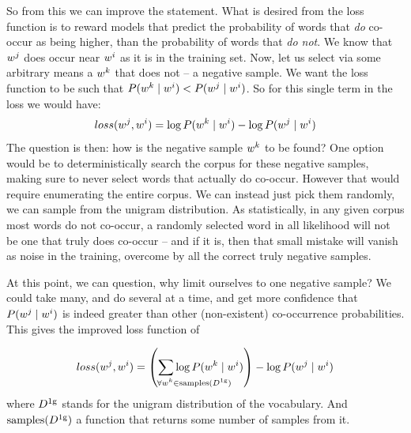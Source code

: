 \documentclass[parskip]{komatufte}
\begin{document}
So from this we can improve the statement.
What is desired from the loss function is to reward models that predict  the probability of words that \emph{do} co-occur as being higher, than the probability of words that \emph{do not}.
We know that $\n w_j$ does occur near $\n w_i$ as it is in the training set.
Now, let us select via some arbitrary means a $\n w_k$ that does not -- a negative sample.
We want the loss function to be such that $P(\n w_k\mid \n w_i) < P(\n w_j\mid \n w_i)$.
So for this single term in the loss we would have:
\begin{equation}
loss(\n w_j,\n w_i) =  \log P(\n w_k\mid \n w_i) - \log P(\n w_j\mid \n w_i)
\end{equation}
%
%
%
The question is then: how is the negative sample $\n w_k$ to be found?
One option would be to deterministically search the corpus for these negative samples, making sure to never select words that actually do co-occur.
However that would require enumerating the entire corpus.
We can instead just pick them randomly, we can sample from the unigram distribution.
As statistically, in any given corpus most words do not co-occur, 
a randomly selected word in all likelihood will not be one that truly does co-occur
-- and if it is, then that small mistake will vanish as noise in the training,
overcome by all the correct truly negative samples.


At this point, we can question, why limit ourselves to one negative sample?
We could take many, and do several at a time,
and get more confidence that $P(\n w_j\mid \n w_i)$ is indeed greater than other (non-existent) co-occurrence probabilities.
This gives the improved loss function of 

\begin{equation}
loss(\n w_j,\n w_i) = 
\left(\sum_{\mathrlap{\!\!\!\!\!\!\forall \n w_k \in \mathrm{samples}(\d D_{1g})}}
\log P(\n w_k\mid \n w_i) \right)
- \log P(\n w_j\mid \n w_i)
\label{equ:samplesloss}
\end{equation}
where $\d D_{1g}$ stands for the unigram distribution of the vocabulary.
And $\mathrm{samples}(\d D_{1g})$ a function that returns some number of samples from it.
\end{document}
